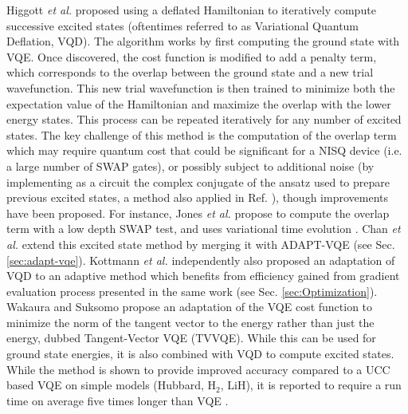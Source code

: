 Higgott \textit{et al.} \cite{higgottVariationalQuantumComputation2019} proposed using a deflated Hamiltonian to iteratively compute successive excited states (oftentimes referred to as Variational Quantum Deflation, VQD). The algorithm works by first computing the ground state with VQE. Once discovered, the cost function is modified to add a penalty term, which corresponds to the overlap between the ground state and a new trial wavefunction. This new trial wavefunction is then trained to minimize both the expectation value of the Hamiltonian and maximize the overlap with the lower energy states. This process can be repeated iteratively for any number of excited states. The key challenge of this method is the computation of the overlap term which may require quantum cost that could be significant for a NISQ device (i.e. a large number of SWAP gates), or possibly subject to additional noise (by implementing as a circuit the complex conjugate of the ansatz used to prepare previous excited states, a method also applied in Ref. \cite{Lee2019}), though improvements have been proposed. For instance, Jones \textit{et al.} \cite{Jones2019} propose to compute the overlap term with a low depth SWAP test, and uses variational time evolution \cite{McArdle2019}. Chan \textit{et al.} \cite{Chan2021} extend this excited state method by merging it with ADAPT-VQE \cite{Grimsley2019} (see Sec. \ref{sec:adapt-vqe}). Kottmann \textit{et al.} \cite{Kottmann2021_3} independently also proposed an adaptation of VQD to an adaptive method which benefits from efficiency gained from gradient evaluation process presented in the same work (see Sec. \ref{sec:Optimization}). Wakaura and Suksomo \cite{Wakaura2021} propose an adaptation of the VQE cost function to minimize the norm of the tangent vector to the energy rather than just the energy, dubbed Tangent-Vector VQE (TVVQE). While this can be used for ground state energies, it is also combined with VQD to compute excited states. While the method is shown to provide improved accuracy compared to a UCC based VQE on simple models (Hubbard, $\mathrm{H_2}$, $\mathrm{LiH}$), it is reported to require a run time on average five times longer than VQE \cite{Wakaura2021}. 

